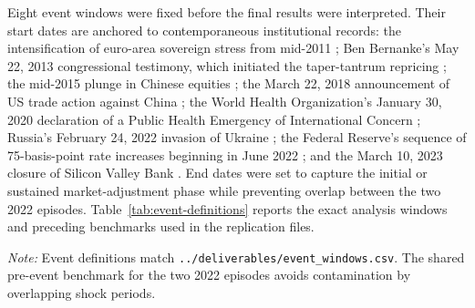 \documentclass[12pt,a4paper]{article}
\begin{document}
Eight event windows were fixed before the final results were interpreted. Their start dates are anchored to contemporaneous institutional records: the intensification of euro-area sovereign stress from mid-2011 \citep{ECB2012FSR}; Ben Bernanke's May 22, 2013 congressional testimony, which initiated the taper-tantrum repricing \citep{Bernanke2013}; the mid-2015 plunge in Chinese equities \citep{BIS2015China}; the March 22, 2018 announcement of US trade action against China \citep{USTR2018}; the World Health Organization's January 30, 2020 declaration of a Public Health Emergency of International Concern \citep{WHO2020}; Russia's February 24, 2022 invasion of Ukraine \citep{UNGA2022}; the Federal Reserve's sequence of 75-basis-point rate increases beginning in June 2022 \citep{FederalReserve2022}; and the March 10, 2023 closure of Silicon Valley Bank \citep{FederalReserve2023SVB}. End dates were set to capture the initial or sustained market-adjustment phase while preventing overlap between the two 2022 episodes. Table~\ref{tab:event-definitions} reports the exact analysis windows and preceding benchmarks used in the replication files.

\begin{table}[H]
\centering
\caption{Prespecified event and benchmark windows}
\label{tab:event-definitions}
\begin{minipage}{0.94\textwidth}
\small\textit{Note:} Event definitions match \texttt{../deliverables/event\_windows.csv}. The shared pre-event benchmark for the two 2022 episodes avoids contamination by overlapping shock periods.
\end{minipage}
\end{table}
\end{document}
